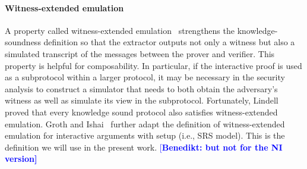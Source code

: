 \documentclass{article}
\theoremstyle{definition}
\newcommand{\benedikt}[1]{{\textcolor{blue}{[\bf Benedikt: #1]}}}
\begin{document}


\paragraph{Witness-extended emulation} A property called witness-extended emulation~\cite{C:Lindell01} strengthens the knowledge-soundness definition so that the extractor outputs not only a witness but also a simulated transcript of the messages between the prover and verifier. This property is helpful for composability. In particular, if the interactive proof is used as a subprotocol within a larger protocol, it may be necessary in the security analysis to construct a simulator that needs to both obtain the adversary's witness as well as simulate its view in the subprotocol. Fortunately, Lindell~\cite{C:Lindell01} proved that every knowledge sound protocol also satisfies witness-extended emulation. Groth and Ishai~\cite{EC:GroIsh08} further adapt the definition of witness-extended emulation for interactive arguments with setup (i.e., SRS model). This is the definition we will use in the present work. \benedikt{but not for the NI version}
\end{document}
